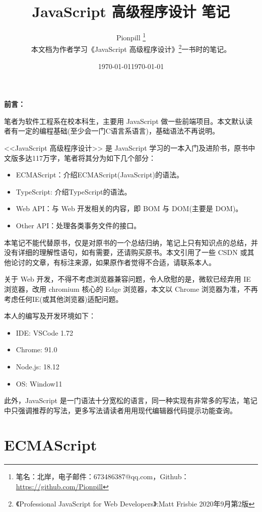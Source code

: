 \documentclass{PionpillNote-book}
\title{JavaScript 高级程序设计 笔记}
\author{
    Pionpill \footnote{笔名：北岸，电子邮件：673486387@qq.com，Github：\url{https://github.com/Pionpill}} \\
    本文档为作者学习《JavaScript 高级程序设计》\footnote{《Professional JavaScript for Web Developers》:Matt Frisbie 2020年9月第2版}一书时的笔记。\\
}
\date{\today}
\begin{document}
\pagestyle{plain}
\maketitle

\noindent\textbf{前言：}

笔者为软件工程系在校本科生，主要用 JavaScript 做一些前端项目。本文默认读者有一定的编程基础(至少会一门C语言系语言)，基础语法不再说明。

<<JavaScript 高级程序设计>> 是 JavaScript 学习的一本入门及进阶书，原书中文版多达117万字，笔者将其分为如下几个部分：
\begin{itemize}
    \item ECMAScript：介绍ECMAScript(JavaScript)的语法。
    \item TypeScript: 介绍TypeScript的语法。 
    \item Web API：与 Web 开发相关的内容，即 BOM 与 DOM(主要是 DOM)。
    \item Other API：处理各类事务文件的接口。
\end{itemize}

本笔记不能代替原书，仅是对原书的一个总结归纳，笔记上只有知识点的总结，并没有详细的理解性语句，如有需要，还请购买原书。本文引用了一些 CSDN 或其他论讨的文章，有标注来源，如果原作者觉得不合适，请联系本人。

关于 Web 开发，不得不考虑浏览器兼容问题，令人欣慰的是，微软已经弃用 IE 浏览器，改用 chromium 核心的 Edge 浏览器，本文以 Chrome 浏览器为准，不再考虑任何IE(或其他浏览器)适配问题。

本人的编写及开发环境如下：
\begin{itemize}
    \item IDE: VSCode 1.72 
    \item Chrome: 91.0
    \item Node.js: 18.12
    \item OS: Window11
\end{itemize}

此外，JavaScript 是一门语法十分宽松的语言，同一种实现有非常多的写法，笔记中只强调推荐的写法，更多写法请读者用用现代编辑器代码提示功能查询。

\date{\today}
\newpage

\tableofcontents

\newpage

\setcounter{page}{1} 
\pagestyle{fancy}

\part{ECMAScript}
\end{document}
